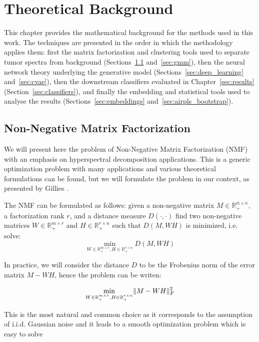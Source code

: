 \chapter{Theoretical Background}
\label{ch:theory}

This chapter provides the mathematical background for the methods used in this work. The
techniques are presented in the order in which the methodology applies them: first the
matrix factorization and clustering tools used to separate tumor spectra from background
(Sections~\ref{sec:nmf} and~\ref{sec:gmm}), then the neural network theory underlying the
generative model (Sections~\ref{sec:deep_learning} and~\ref{sec:cvae}), then the downstream
classifiers evaluated in Chapter~\ref{sec:results} (Section~\ref{sec:classifiers}), and
finally the embedding and statistical tools used to analyse the results
(Sections~\ref{sec:embeddings} and~\ref{sec:airpls_bootstrap}).


\section{Non-Negative Matrix Factorization}
\label{sec:nmf}

We will present here the problem of Non-Negative Matrix Factorization (NMF) with an emphasis on hyperspectral decomposition applications. This is a generic optimization problem with many applications and various theoretical formulations can be found, but we will formulate the problem in our context, as presented by Gillies \cite{Gillis2017,Gillis2020}.

The NMF can be formulated as follows: given a non-negative matrix $M \in \mathbb{R_+^{m \times n}}$, a factorization rank $r$, and a distance measure $D(\cdot,\cdot)$ find two non-negative matrices $W \in \mathbb{R}_+^{m \times r}$ and $H \in \mathbb{R}_+^{r \times n}$ such that $D(M,WH)$ is minimized, i.e. solve:
$$ \min_{W \in \mathbb{R}_+^{m \times r}, H \in \mathbb{R}_+^{r \times n}} D(M,WH)$$

In practice, we will consider the distance $D$ to be the Frobenius norm of the error matrix $M-WH$, hence the problem can be writen:

$$ \min_{W \in \mathbb{R}_+^{m \times r}, H \in \mathbb{R}_+^{r \times n}} \lVert M-WH\rVert_F^2$$

This is the most natural and common choice as it corresponds to the assumption of i.i.d. Gaussian noise and it leads to a smooth optimization problem which is easy to solve \cite{Gillis2020}

